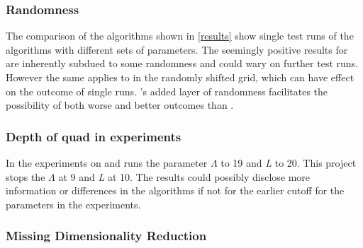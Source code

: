 \subsubsection{Randomness}
\label{disc/threats/randomness}
The comparison of the algorithms shown in \ref{results} show single test runs of the algorithms with different sets of parameters. The seemingly positive results for \qsr{} are inherently subdued to some randomness and could wary on further test runs. However the same applies to \qs{} in the randomly shifted grid, which can have effect on the outcome of single runs. \qsr{}'s added layer of randomness facilitates the possibility of both worse and better outcomes than \qs{}.

\subsubsection{Depth of quad in experiments}
In \cite{wagner17} the experiments on \qs{} and \grid{} runs the parameter $\Lambda$ to 19 and \textit{L} to 20. This project stops the $\Lambda$ at 9 and \textit{L} at 10. The results could possibly disclose more information or differences in the algorithms if not for the earlier cutoff for the parameters in the experiments.

\subsubsection{Missing Dimensionality Reduction}
